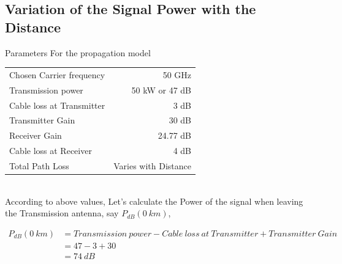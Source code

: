 \documentclass[a4paper,11pt]{article}%
\begin{document}
%
%

\pagebreak
\subsection{Variation of the Signal Power with the Distance}

Parameters For the propagation model\\

\begin{tabular}{l r}
Chosen Carrier frequency & 50 GHz\\
Transmission power & 50 kW or 47 dB\\
Cable loss at Transmitter & 3 dB\\
Transmitter Gain & 30 dB\\
Receiver Gain &24.77 dB\\
Cable loss at Receiver &4 dB\\
Total Path Loss & Varies with Distance\\
\end{tabular}\\[1cm]

According to above values, Let's calculate the Power of the signal when leaving the  Transmission antenna, say $P_{dB}(0~km)$,

\[
\begin{split}
P_{dB}(0~km) & = Transmission~power -  Cable~loss~at~Transmitter + Transmitter~Gain\\
&=47-3+30\\
&=74~dB
\end{split}
\]
\end{document}

